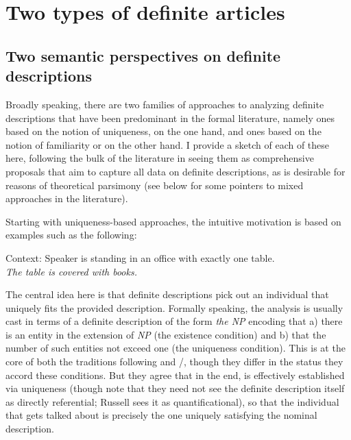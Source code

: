 \documentclass[output=paper
,modfonts
,nonflat]{langscibook}
\begin{document}
\section{Two types of definite articles}

\subsection{Two semantic perspectives on definite descriptions}

Broadly speaking, there are two families of approaches to analyzing
definite descriptions that have been
predominant in the formal literature, namely ones based on the notion
of uniqueness, on the one hand, and ones based on the notion of
familiarity or  on the other hand. I provide a sketch of each of these here,
following the bulk of the literature in seeing them as comprehensive
proposals that aim to capture all data on definite descriptions, as is desirable
for reasons of theoretical parsimony (see below for some pointers to
mixed approaches in the literature).

Starting with uniqueness-based approaches, the intuitive motivation
is based on examples such as the following:

\begin{exe}
\ex\label{ex:schwarz:1}
Context: Speaker is standing in an office with {exactly one table}.\\
\textit{The table is covered with books.}

\end{exe}

The central idea here is that definite descriptions pick out an individual that
uniquely fits the provided description. Formally speaking, the analysis is usually cast in
terms of a definite description of the form \textit{the NP} encoding
that a) there is an entity in the extension of \textit{NP} (the
existence condition) and b)
that the number of such entities not exceed one (the uniqueness
condition). This is at the core of both the traditions following
\citeauthor{Russell1905} and \citeauthor{Frege1892}/\citeauthor{Strawson1950}, though they differ in the status they
accord these conditions. But they agree that in the end,  is
effectively established via uniqueness (though note that they need not see the
definite description itself as directly referential; Russell sees it
as quantificational), so that the individual
that gets talked about is precisely the one uniquely satisfying the
nominal description.
\end{document}
